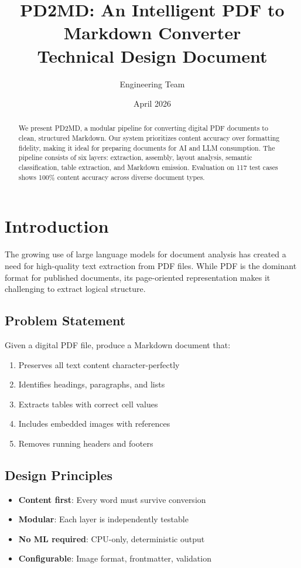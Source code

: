 \documentclass[12pt]{article}
\title{PD2MD: An Intelligent PDF to Markdown Converter\\
\large Technical Design Document}
\author{Engineering Team}
\date{April 2026}
\begin{document}
\maketitle

\begin{abstract}
We present PD2MD, a modular pipeline for converting digital PDF documents to
clean, structured Markdown. Our system prioritizes content accuracy over
formatting fidelity, making it ideal for preparing documents for AI and LLM
consumption. The pipeline consists of six layers: extraction, assembly, layout
analysis, semantic classification, table extraction, and Markdown emission.
Evaluation on 117 test cases shows 100\% content accuracy across diverse
document types.
\end{abstract}

\section{Introduction}
The growing use of large language models for document analysis has created a
need for high-quality text extraction from PDF files. While PDF is the dominant
format for published documents, its page-oriented representation makes it
challenging to extract logical structure.

\subsection{Problem Statement}
Given a digital PDF file, produce a Markdown document that:
\begin{enumerate}
    \item Preserves all text content character-perfectly
    \item Identifies headings, paragraphs, and lists
    \item Extracts tables with correct cell values
    \item Includes embedded images with references
    \item Removes running headers and footers
\end{enumerate}

\subsection{Design Principles}
\begin{itemize}
    \item \textbf{Content first}: Every word must survive conversion
    \item \textbf{Modular}: Each layer is independently testable
    \item \textbf{No ML required}: CPU-only, deterministic output
    \item \textbf{Configurable}: Image format, frontmatter, validation
\end{itemize}
\end{document}
